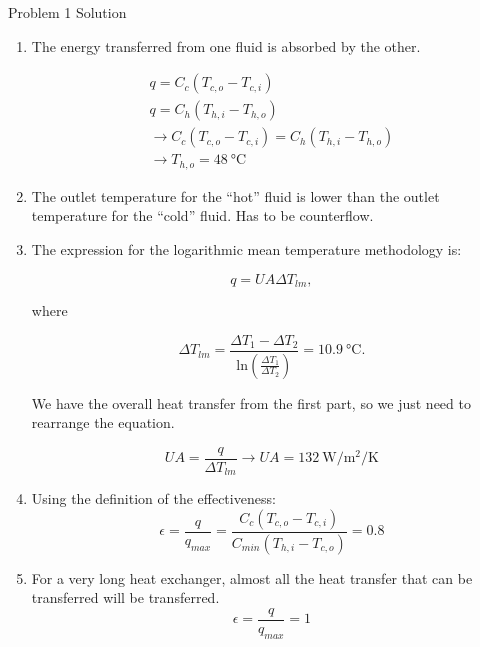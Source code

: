 \documentclass[9pt, aspectratio=169, handout]{beamer}
\begin{document}
\begin{frame}[allowframebreaks]{Problem 1 Solution}
    \begin{enumerate}
        \item The energy transferred from one fluid is absorbed by the other.

        \begin{gather*}
            q = C_c \left( T_{c,o} - T_{c,i} \right) \\
            q = C_h \left( T_{h,i} - T_{h,o} \right) \\ 
            \to C_c \left( T_{c,o} - T_{c,i} \right) = C_h \left( T_{h,i} - T_{h,o} \right) \\
            \to T_{h,o} = \SI{48}{\celsius}
        \end{gather*}

        \item The outlet temperature for the ``hot'' fluid is lower than the outlet temperature for the ``cold'' fluid.
            Has to be counterflow.
        \item The expression for the logarithmic mean temperature methodology is:

            \begin{equation*}
                q = \mathit{UA} \Delta T_{lm},
            \end{equation*}

            where

            \begin{equation*}
                \Delta T_{lm} = \frac{\Delta T_1 - \Delta T_2}{\mathrm{ln} \left( \frac{\Delta T_1}{\Delta T_2} \right)} = \SI{10.9}{\celsius}.
            \end{equation*}

            We have the overall heat transfer from the first part, so we just need to rearrange the equation.

            \begin{equation*}
                \mathit{UA} = \frac{q}{\Delta T_{lm}} \to \mathit{UA} = \SI{132}{\watt\per\square\meter\per\kelvin}
            \end{equation*}
        \item Using the definition of the effectiveness:
            \begin{equation*}
                \epsilon = \frac{q}{q_{\mathit{max}}} = \frac{C_c \left( T_{c,o} - T_{c,i}  \right)}{C_{\mathit{min}} \left( T_{h,i} - T_{c,o}  \right)} = 0.8
            \end{equation*}
        \item For a very long heat exchanger, almost all the heat transfer that can be transferred will be transferred.
            \begin{equation*}
                \epsilon = \frac{q}{q_{\mathit{max}}} = 1
            \end{equation*}
    \end{enumerate}
\end{frame}
\end{document}
